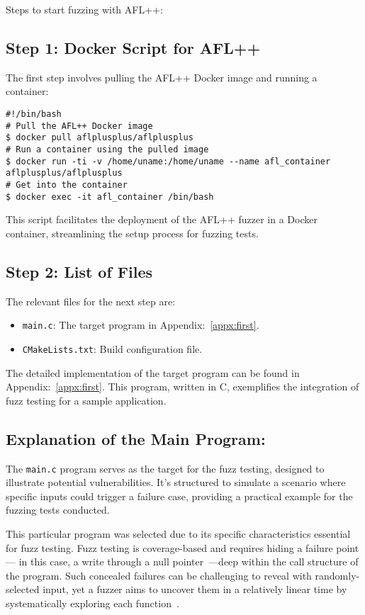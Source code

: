 Steps to start fuzzing with AFL++:

\subsection*{Step 1: Docker Script for AFL++}
\label{subsec:docker script for afl-fuzz}
The first step involves pulling the AFL++ Docker image and running a container:
\begin{verbatim}
#!/bin/bash
# Pull the AFL++ Docker image
$ docker pull aflplusplus/aflplusplus
# Run a container using the pulled image
$ docker run -ti -v /home/uname:/home/uname --name afl_container aflplusplus/aflplusplus
# Get into the container
$ docker exec -it afl_container /bin/bash
\end{verbatim}

This script facilitates the deployment of the AFL++ fuzzer in a Docker container,
streamlining the setup process for fuzzing tests.

\subsection*{Step 2: List of Files}
The relevant files for the next step are:
\begin{itemize}
    \item \texttt{main.c}: The target program in Appendix:~\ref{appx:first}.
    \item \texttt{CMakeLists.txt}: Build configuration file.
\end{itemize}

The detailed implementation of the target program can be
found in Appendix:~\ref{appx:first}. This program, written
in C, exemplifies the integration of fuzz testing for a sample application.

\subsection*{Explanation of the Main Program:}
The \texttt{main.c} program serves as the target for the fuzz testing,
designed to illustrate potential vulnerabilities.
It's structured to simulate a scenario where specific inputs could trigger a
failure case, providing a practical example for the fuzzing tests conducted.

This particular program was selected due to its specific characteristics
essential for fuzz testing. Fuzz testing is coverage-based and requires hiding a
failure point— in this case, a write through a null pointer~\cite{spoto2011precise}—deep within the call
structure of the program. Such concealed failures can be challenging to reveal
with randomly-selected input, yet a fuzzer aims to uncover them in a relatively
linear time by systematically exploring each function~\cite{FuzzingE54:online}.

